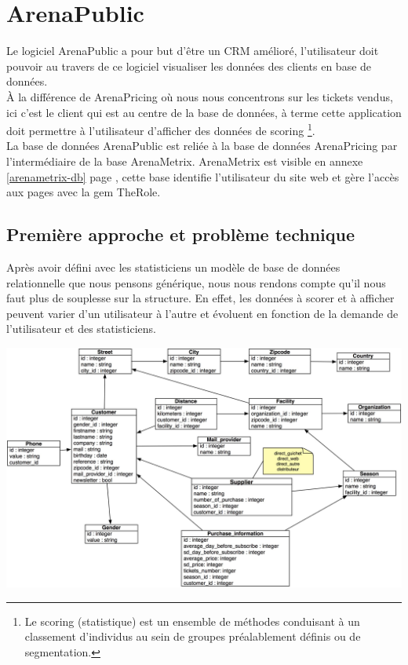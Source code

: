 \section{ArenaPublic}
Le logiciel ArenaPublic a pour but d'être un CRM amélioré, l'utilisateur doit pouvoir au travers de ce logiciel visualiser les données des clients en base de données. 
\\

À la différence de ArenaPricing où nous nous concentrons sur les tickets vendus, ici c'est le client qui est au centre de la base de données, à terme cette application doit permettre à l'utilisateur d'afficher des données de scoring \footnote{Le scoring (statistique) est un ensemble de méthodes conduisant à un classement d'individus au sein de groupes préalablement définis ou de segmentation.}.
\\

La base de données ArenaPublic est reliée à la base de données ArenaPricing par l'intermédiaire de la base ArenaMetrix. ArenaMetrix est visible en annexe \ref{arenametrix-db} page \pageref{arenametrix-db}, cette base identifie l'utilisateur du site web et gère l'accès aux pages avec la gem TheRole.

\subsection{Première approche et problème technique}
Après avoir défini avec les statisticiens un modèle de base de données relationnelle que nous pensons générique, nous nous rendons compte qu'il nous faut plus de souplesse sur la structure. En effet, les données à scorer et à afficher peuvent varier d'un utilisateur à l'autre et évoluent en fonction de la demande de l'utilisateur et des statisticiens.

\begin{center}
\includegraphics[scale=0.2]{images/arenapublic-1.jpg}
\label{arenapublic-1}
\end{center}


